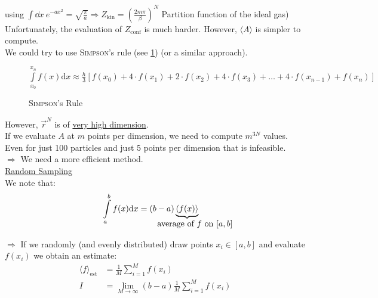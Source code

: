 using $\int\dd x\ e^{-ax^2} = \sqrt{\frac{\pi}{a}}\Rightarrow Z_\text{kin} = \left(\frac{2m\pi}{\beta}\right)^N$ Partition function of the ideal gas)\\

Unfortunately, the evaluation of $Z_\text{conf}$ is much harder. However, $\langle A \rangle$ is simpler to compute.\\
We could try to use \textsc{Simpson}'s rule (see \cref{pic:simpsons_rule}) (or a similar approach).\\

\begin{figure}[!h]
\centering
{}
\caption{\textsc{Simpson}'s Rule}{$\int\limits_{x_0}^{x_n} f(x)\text{d} x\approx\frac{h}{3}\left[f(x_0) + 4\cdot f(x_1) + 2\cdot f(x_2)+4\cdot f(x_3)+\dots+4\cdot f(x_{n-1}) + f(x_n)\right]$}
\label{pic:simpsons_rule}
\end{figure}

However, $\vec{r}^N$ is of \underline{very high dimension}.\\
If we evaluate $A$ at $m$ points per dimension, we need to compute $m^{3N}$ values. Even for just 100 particles and just 5 points per dimension that is infeasible.\\
$\Rightarrow$ We need a more efficient method.\\

\underline{Random Sampling}\\
We note that:
\begin{align}
	\int\limits_{a}^{b} f(x) \text{d}x &= (b-a)\underbrace{\langle f(x)\rangle}_{\parbox{.5cm}{\hspace*{-1cm}$\text{average of } f \text{ on } [a, b]$}}
\end{align}

$\Rightarrow$ If we randomly (and evenly distributed) draw points $x_i\in[a, b]$ and evaluate $f(x_i)$ we obtain an estimate:
\begin{align}
	\langle f \rangle_\text{est} &= \frac{1}{M} \sum\limits_{i=1}^{M}f(x_i)\\
	I &= \lim\limits_{M\to\infty} (b-a)\frac{1}{M} \sum\limits_{i=1}^{M}f(x_i)
\end{align}

